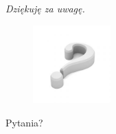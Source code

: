 \documentclass[xcolor=x11names,compress]{beamer}
\renewcommand{\(}{\begin{columns}}
\renewcommand{\)}{\end{columns}}
\newcommand{\<}[1]{\begin{column}{#1}}
\renewcommand{\>}{\end{column}}
\begin{document}
\subsection*{}
\begin{frame}{}

\it
\Large{Dziękuję za uwagę.}

\begin{figure}[h!]
\centering
\includegraphics[width=3cm]{../Common/img/qmark}
\end{figure}

\hfill\Large{Pytania?}

\end{frame}





\end{document}
